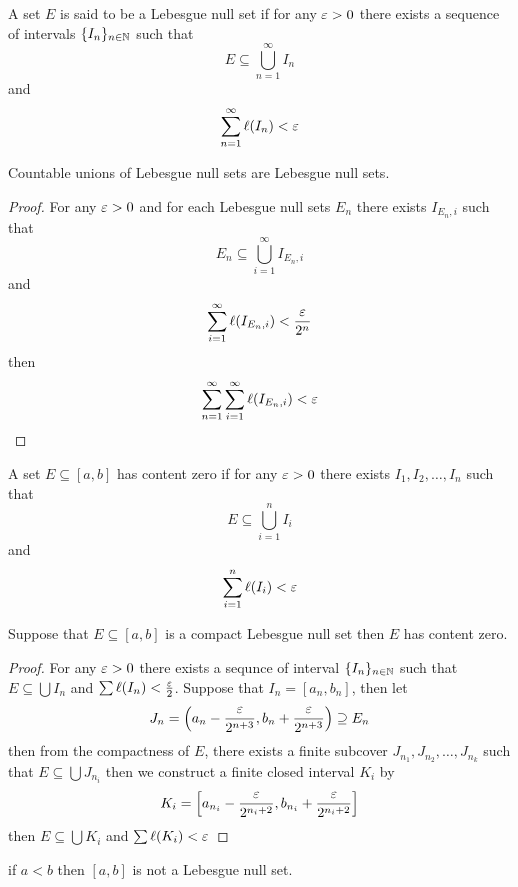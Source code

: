 \begin{definition}
  A set $E$ is said to be a Lebesgue null set if for any $\varepsilon > 0$ there exists a sequence of intervals $\{I_n\}_{n\in\mathbb N}$ such that
  \[E \subseteq \bigcup_{n=1}^{\infty}I_n\]
  and
  \[\sum_{n=1}^{\infty}\ell(I_n) < \varepsilon\]
\end{definition}

\begin{lemma}
  Countable unions of Lebesgue null sets are Lebesgue null sets.
\end{lemma}

\begin{proof}
  For any $\varepsilon > 0$ and for each Lebesgue null sets $E_n$ there exists $I_{E_n, i}$ such that 
  \[E_n \subseteq \bigcup_{i=1}^{\infty}I_{E_n, i}\] and \[ \sum_{i=1}^{\infty}\ell(I_{E_n, i}) < \frac{\varepsilon}{2^n}\]
  then
  \[ \sum_{n=1}^{\infty}\sum_{i=1}^{\infty}\ell(I_{E_n, i}) < \varepsilon\]
\end{proof}

\begin{definition}
  A set $E\subseteq [a, b]$ has content zero if for any $\varepsilon > 0$ there exists $I_1, I_2, \ldots, I_n$ such that
  \[E \subseteq \bigcup_{i=1}^{n}I_i\]
  and
  \[\sum_{i=1}^{n}\ell(I_i) < \varepsilon\] 
\end{definition}

\begin{lemma}\label{lem:compact-null-lebesgue-is-content-zero}
  Suppose that $E \subseteq [a, b]$ is a compact Lebesgue null set then $E$ has content zero.
\end{lemma}

\begin{proof}
  For any $\varepsilon > 0$ there exists a sequnce of interval 
  $\{I_n\}_{n \in \mathbb N}$ such that $E\subseteq \bigcup I_n$ and $\sum \ell(I_n) < \frac{\varepsilon}2$.
  Suppose that $I_n = [a_n, b_n]$, then let $$J_n = \left(a_n - \frac{\varepsilon}{2^{n+3}}, b_n + \frac{\varepsilon}{2^{n+3}}\right) \supseteq E_n$$ then
  from the compactness of $E$, there exists a finite subcover $J_{n_1}, J_{n_2}, \dotsc, J_{n_k}$ such that $E \subseteq \bigcup J_{n_i}$ 
  then we construct a finite closed interval $K_i$ by 
  $$K_i = \left[a_{n_i} - \frac{\varepsilon}{2^{n_i+2}}, b_{n_i} + \frac{\varepsilon}{2^{n_i+2}}\right]$$ then
  $E \subseteq \bigcup K_i$ and $\sum \ell(K_i) < \varepsilon$
\end{proof}

\begin{corollary}
  if $a < b$ then $[a, b]$ is not a Lebesgue null set.
\end{corollary}

